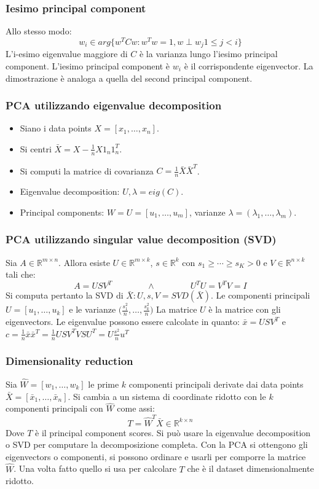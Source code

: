 \subsubsection{Iesimo principal component}
Allo stesso modo:
$$w_i\in arg\{w^TCw:w^Tw=1,w\perp w_j 1\le j < i\}$$
L'i-esimo eigenvalue maggiore di $C$ \`e la varianza lungo l'iesimo principal component.
L'iesimo principal component \`e $w_i$ \`e il corrispondente eigenvector.
La dimostrazione \`e analoga a quella del second principal component.

\subsubsection{PCA utilizzando eigenvalue decomposition}
\begin{itemize}
	\item Siano i data points $X=[x_1,\dots,x_n]$.
	\item Si centri $\bar{X} = X-\frac{1}{n}X1_n1_n^T$.
	\item Si computi la matrice di covarianza $C=\frac{1}{n}\bar{X}\bar{X}^T$.
	\item Eigenvalue decomposition: $U,\lambda = eig(C)$.
	\item Principal components: $W=U=[u_1,\dots,u_m]$, varianze $\lambda = (\lambda_1,\dots,\lambda_m)$.
\end{itemize}

\subsubsection{PCA utilizzando singular value decomposition (SVD)}
Sia $A\in\mathbb{R}^{m\times n}$.
Allora esiste $U\in\mathbb{R}^{m\times k}$, $s\in\mathbb{R}^k$ con $s_1\ge\cdots\ge s_K >0$ e $V\in \mathbb{R}^{n\times k}$ tali che:
$$A = USV^T\qquad\qquad\land\qquad\qquad U^TU=V^TV=I$$
Si computa pertanto la SVD di $\bar{X}:U,s,V=SVD(\bar{X})$.
Le componenti principali $U=[u_1,\dots,u_k]$ e le varianze $\bigl(\frac{s_1^2}{n},\dots,\frac{s_k^2}{n}\bigr)$
La matrice $U$ \`e la matrice con gli eigenvectors.
Le eigenvalue possono essere calcolate in quanto: $\bar{x} = USV^T$ e $c = \frac{1}{n}\bar{x}\bar{x}^T = \frac{1}{n}USV^TVSU^T=U\frac{s^2}{n}u^T$

\subsubsection{Dimensionality reduction}
Sia $\hat{W} = [w_1,\dots,w_k]$ le prime $k$ componenti principali derivate dai data points $\bar{X} = [\bar{x}_1,\dots,\bar{x}_n]$.
Si cambia a un sistema di coordinate ridotto con le $k$ componenti principali con $\hat{W}$ come assi:
$$T = \hat{W}^T\bar{X}\in\mathbb{R}^{k\times n}$$
Dove $T$ \`e il principal component scores.
Si pu\`o usare la eigenvalue decomposition o SVD per computare la decomposizione completa.
Con la PCA si ottengono gli eigenvectors o componenti, si possono ordinare e usarli per comporre la matrice $\hat{W}$.
Una volta fatto quello si usa per calcolare $T$ che \`e il dataset dimensionalmente ridotto.

